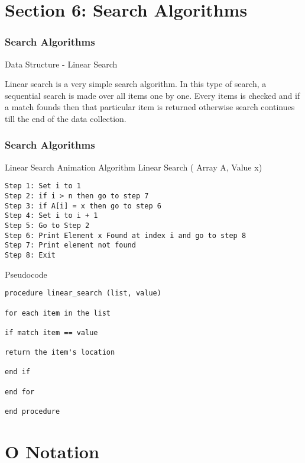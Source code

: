 \documentclass{beamer}
\begin{document}
\section{Section 6: Search Algorithms}
\begin{frame}
\frametitle{Search Algorithms}
\large
Data Structure - Linear Search

Linear search is a very simple search algorithm. In this type of search, a sequential search is made over all items one by one. Every items is checked and if a match founds then that particular item is returned otherwise search continues till the end of the data collection.
\end{frame}

\begin{frame}[fragile]
\frametitle{Search Algorithms}
\large
Linear Search Animation
Algorithm
Linear Search ( Array A, Value x)
\begin{verbatim}
Step 1: Set i to 1
Step 2: if i > n then go to step 7
Step 3: if A[i] = x then go to step 6
Step 4: Set i to i + 1
Step 5: Go to Step 2
Step 6: Print Element x Found at index i and go to step 8
Step 7: Print element not found
Step 8: Exit
\end{verbatim}
\end{frame}

\begin{frame}[fragile]
Pseudocode
\begin{verbatim}
procedure linear_search (list, value)

for each item in the list

if match item == value

return the item's location

end if

end for

end procedure 
\end{verbatim}

\end{frame}

\section{O Notation}
\end{document}
